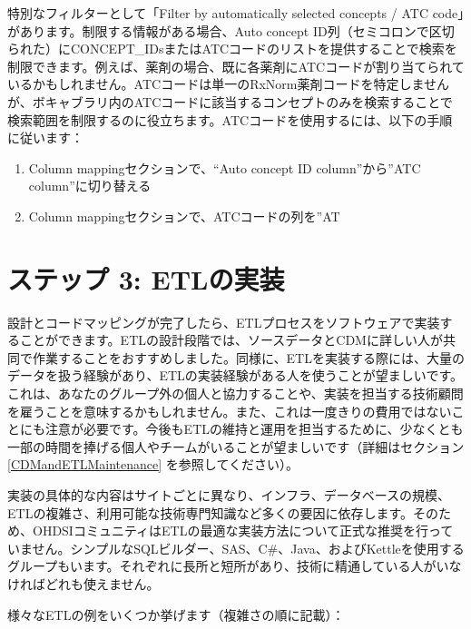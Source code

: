 \documentclass[
  11pt]{book}
\providecommand{\tightlist}{%
  \setlength{\itemsep}{0pt}\setlength{\parskip}{0pt}}
\theoremstyle{definition}
\theoremstyle{definition}
\theoremstyle{definition}
\theoremstyle{definition}
\theoremstyle{remark}
\begin{document}
特別なフィルターとして「Filter by automatically selected concepts / ATC code」があります。制限する情報がある場合、Auto concept ID列（セミコロンで区切られた）にCONCEPT\_IDsまたはATCコードのリストを提供することで検索を制限できます。例えば、薬剤の場合、既に各薬剤にATCコードが割り当てられているかもしれません。ATCコードは単一のRxNorm薬剤コードを特定しませんが、ボキャブラリ内のATCコードに該当するコンセプトのみを検索することで検索範囲を制限するのに役立ちます。ATCコードを使用するには、以下の手順に従います：

\begin{enumerate}
\def\labelenumi{\arabic{enumi}.}
\tightlist
\item
  Column mappingセクションで、``Auto concept ID column''から''ATC column''に切り替える
\item
  Column mappingセクションで、ATCコードの列を''AT
\end{enumerate}

\section{ステップ 3: ETLの実装}\label{ux30b9ux30c6ux30c3ux30d7-3-etlux306eux5b9fux88c5}

設計とコードマッピングが完了したら、ETLプロセスをソフトウェアで実装することができます。ETLの設計段階では、ソースデータとCDMに詳しい人が共同で作業することをおすすめしました。同様に、ETLを実装する際には、大量のデータを扱う経験があり、ETLの実装経験がある人を使うことが望ましいです。これは、あなたのグループ外の個人と協力することや、実装を担当する技術顧問を雇うことを意味するかもしれません。また、これは一度きりの費用ではないことにも注意が必要です。今後もETLの維持と運用を担当するために、少なくとも一部の時間を捧げる個人やチームがいることが望ましいです（詳細はセクション \ref{CDMandETLMaintenance} を参照してください）。

実装の具体的な内容はサイトごとに異なり、インフラ、データベースの規模、ETLの複雑さ、利用可能な技術専門知識など多くの要因に依存します。そのため、OHDSIコミュニティはETLの最適な実装方法について正式な推奨を行っていません。シンプルなSQLビルダー、SAS、C\#、Java、およびKettleを使用するグループもいます。それぞれに長所と短所があり、技術に精通している人がいなければどれも使えません。

様々なETLの例をいくつか挙げます（複雑さの順に記載）：
\end{document}
